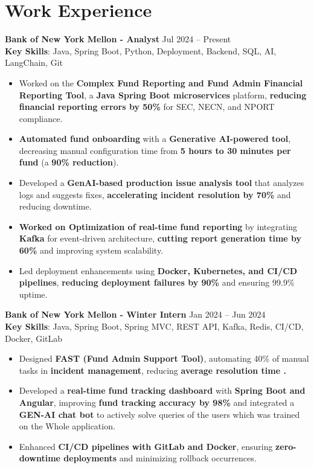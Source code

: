 \documentclass[a4paper,10pt]{article}
\begin{document}
\section*{Work Experience}

\textbf{Bank of New York Mellon - Analyst} \hfill Jul 2024 -- Present\\
\textbf{Key Skills}: Java, Spring Boot, Python, Deployment, Backend, SQL, AI, LangChain, Git  
\begin{itemize}
    \item Worked on the \textbf{Complex Fund Reporting and Fund Admin Financial Reporting Tool}, a \textbf{Java Spring Boot microservices} platform, \textbf{reducing financial reporting errors by 50\%} for SEC, NECN, and NPORT compliance.  
    \item \textbf{Automated fund onboarding} with a \textbf{Generative AI-powered tool}, decreasing manual configuration time from \textbf{5 hours to 30 minutes per fund} (a \textbf{90\% reduction}).  
    \item Developed a \textbf{GenAI-based production issue analysis tool} that analyzes logs and suggests fixes, \textbf{accelerating incident resolution by 70\%} and reducing downtime.  
    \item \textbf{Worked on Optimization of real-time fund reporting} by integrating \textbf{Kafka} for event-driven architecture, \textbf{cutting report generation time by 60\%} and improving system scalability.  
    \item Led deployment enhancements using \textbf{Docker, Kubernetes, and CI/CD pipelines}, \textbf{reducing deployment failures by 90\%} and ensuring 99.9\% uptime.
\end{itemize}
\vspace{3 pt}
\textbf{Bank of New York Mellon - Winter Intern} \hfill Jan 2024 -- Jun 2024\\
\textbf{Key Skills}: Java, Spring Boot, Spring MVC, REST API, Kafka, Redis, CI/CD, Docker, GitLab  
\begin{itemize}
    \item Designed \textbf{FAST (Fund Admin Support Tool)}, automating 40\% of manual tasks in \textbf{incident management}, reducing \textbf{average resolution time .}  
    \item Developed a \textbf{real-time fund tracking dashboard} with \textbf{Spring Boot and Angular}, improving \textbf{fund tracking accuracy by 98\%} and  integrated a \textbf{GEN-AI chat bot }to actively solve queries of the users which was trained on the Whole application.
    \item Enhanced \textbf{CI/CD pipelines with GitLab and Docker}, ensuring \textbf{zero-downtime deployments} and minimizing rollback occurrences.  
\end{itemize}
\end{document}
